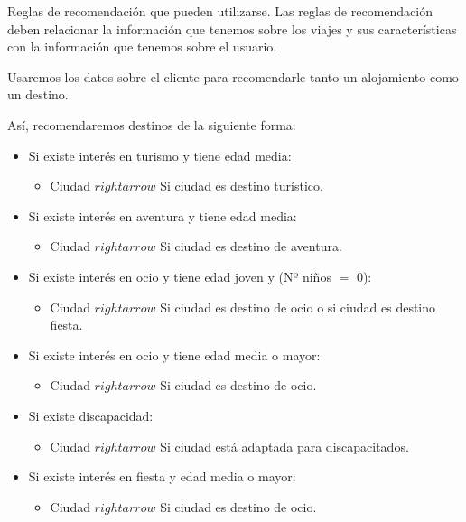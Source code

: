 \documentclass[11pt, a4paper, spanish, openright, twoside]{book}
\begin{document}
		\begin{section}{Reglas de recomendación que pueden utilizarse.}
			Las reglas de recomendación deben relacionar la información que tenemos sobre los viajes y sus características con la información que tenemos 
			sobre el usuario.
			
			
			Usaremos los datos sobre el cliente para recomendarle tanto un alojamiento como un destino. 
			
			Así, recomendaremos destinos de la siguiente forma:
			
				\begin{itemize}

					\item Si existe interés en turismo y tiene edad media:
						\begin{itemize}
							\item Ciudad $rightarrow$  Si ciudad es destino turístico.
						\end{itemize}
					\item Si existe interés en aventura y tiene edad media:						
						\begin{itemize}
							\item Ciudad $rightarrow$  Si ciudad es destino de aventura.
						\end{itemize}
					\item Si existe interés en ocio y tiene edad joven y (Nº niños $=$ 0):
						\begin{itemize}
							\item Ciudad $rightarrow$  Si ciudad es destino de ocio o si ciudad es destino fiesta.
						\end{itemize}
					\item Si existe interés en ocio y tiene edad media o mayor:
						\begin{itemize}
							\item Ciudad $rightarrow$  Si ciudad es destino de ocio.
						\end{itemize}
					\item Si existe discapacidad:						
						\begin{itemize}
							\item Ciudad $rightarrow$  Si ciudad está adaptada para discapacitados.
						\end{itemize}
					\item Si existe interés en fiesta y edad media o mayor:
						\begin{itemize}
							\item Ciudad $rightarrow$  Si ciudad es destino de ocio.
						\end{itemize}


\end{itemize}
\end{section}
\end{document}

